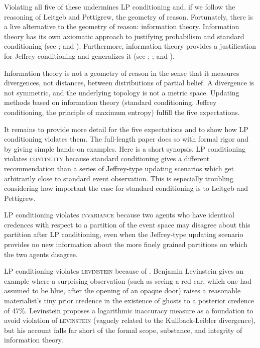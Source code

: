 \documentclass[11pt]{article} \usepackage{october}
\begin{document}
Violating all five of these undermines LP conditioning and, if we
follow the reasoning of Leitgeb and Pettigrew, the geometry of reason.
Fortunately, there is a live alternative to the geometry of reason:
information theory. Information theory has its own axiomatic approach
to justifying probabilism and standard conditioning (see
; and ).
Furthermore, information theory provides a justification for Jeffrey
conditioning and generalizes it (see ;
; and ).

Information theory is not a geometry of reason in the sense that it
measures divergences, not distances, between distributions of partial
belief. A divergence is not symmetric, and the underlying topology is
not a metric space. Updating methods based on information theory
(standard conditioning, Jeffrey conditioning, the principle of maximum
entropy) fulfill the five expectations.

It remains to provide more detail for the five expectations and to
show how LP conditioning violates them. The full-length paper does so
with formal rigor and by giving simple hands-on examples. Here is a
short synopsis. LP conditioning violates \textsc{continuity} because
standard conditioning gives a different recommendation than a series
of Jeffrey-type updating scenarios which get arbitrarily close to
standard event observation. This is especially troubling considering
how important the case for standard conditioning is to Leitgeb and
Pettigrew.

LP conditioning violates \textsc{invariance} because two agents who
have identical credences with respect to a partition of the event
space may disagree about this partition after LP conditioning, even
when the Jeffrey-type updating scenario provides no new information
about the more finely grained partitions on which the two agents
disagree.

LP conditioning violates \textsc{levinstein} because of 
. Benjamin Levinstein gives an example
where a surprising observation (such as seeing a red car, which one
had assumed to be blue, after the opening of an opaque door) raises a
reasonable materialist's tiny prior credence in the existence of
ghosts to a posterior credence of 47\%. Levinstein proposes a
logarithmic inaccuracy measure as a foundation to avoid violation of
\textsc{levinstein} (vaguely related to the Kullback-Leibler
divergence), but his account falls far short of the formal scope,
substance, and integrity of information theory.
\end{document}
